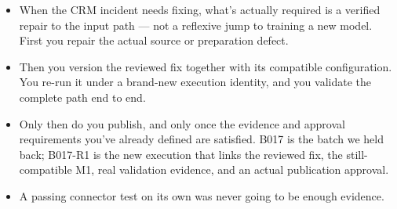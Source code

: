 \documentclass[11pt,a4paper]{article}
\begin{document}
\begin{examplebox}[title after break={SPOKEN SCRIPT --- slide 37 continued}]
\begin{itemize}
\item When the CRM incident needs fixing, what's actually required is a verified repair to the input path — not a reflexive jump to training a new model. First you repair the actual source or preparation defect.
\item Then you version the reviewed fix together with its compatible configuration. You re-run it under a brand-new execution identity, and you validate the complete path end to end.
\item Only then do you publish, and only once the evidence and approval requirements you've already defined are satisfied. B017 is the batch we held back; B017-R1 is the new execution that links the reviewed fix, the still-compatible M1, real validation evidence, and an actual publication approval.
\item A passing connector test on its own was never going to be enough evidence.
\end{itemize}
\end{examplebox}
\par\noindent{\scriptsize\textcolor{teal!60!black}{Reading anchor: Bass, §14.1 · Kalinowski, §16.3–16.5 (supporting)}}
\clearpage
\end{document}
